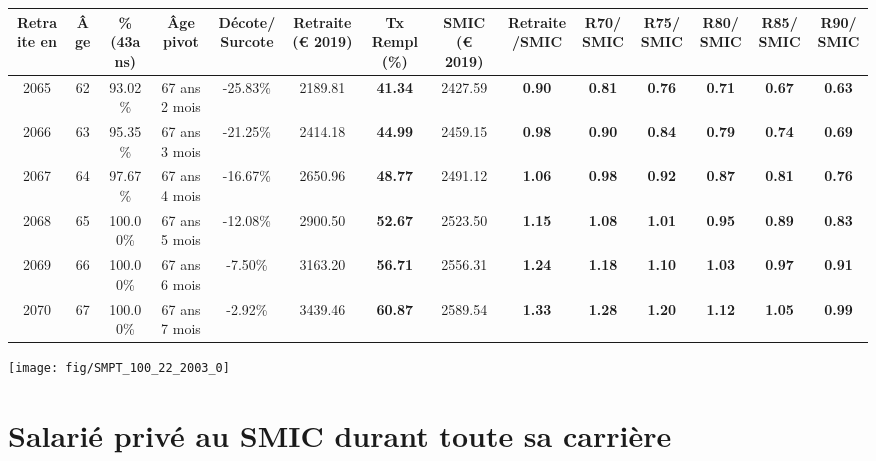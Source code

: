 \begin{adjustbox}{max width=\textwidth} 
\begin{tabular}[htb]{|c|c||c|c|c||c|c||c|c||c|c|c|c|c|} 
\hline 
 Retraite en &  Âge &  \%(43ans) &  Âge pivot &  Décote/Surcote &  Retraite (\euro{} 2019) &  Tx Rempl(\%) &  SMIC (\euro{} 2019) &  Retraite/SMIC &  R70/SMIC &  R75/SMIC &  R80/SMIC &  R85/SMIC &  R90/SMIC \\ 
\hline \hline 
 2065 &  62 &  93.02\% &  67 ans 2 mois &  -25.83\% &  2189.81 &  {\bf 41.34} &  2427.59 &  {\bf {\color{red} 0.90}} &  {\bf {\color{red} 0.81}} &  {\bf {\color{red} 0.76}} &  {\bf {\color{red} 0.71}} &  {\bf {\color{red} 0.67}} &  {\bf {\color{red} 0.63}} \\ 
\hline 
 2066 &  63 &  95.35\% &  67 ans 3 mois &  -21.25\% &  2414.18 &  {\bf 44.99} &  2459.15 &  {\bf {\color{red} 0.98}} &  {\bf {\color{red} 0.90}} &  {\bf {\color{red} 0.84}} &  {\bf {\color{red} 0.79}} &  {\bf {\color{red} 0.74}} &  {\bf {\color{red} 0.69}} \\ 
\hline 
 2067 &  64 &  97.67\% &  67 ans 4 mois &  -16.67\% &  2650.96 &  {\bf 48.77} &  2491.12 &  {\bf 1.06} &  {\bf {\color{red} 0.98}} &  {\bf {\color{red} 0.92}} &  {\bf {\color{red} 0.87}} &  {\bf {\color{red} 0.81}} &  {\bf {\color{red} 0.76}} \\ 
\hline 
 2068 &  65 &  100.00\% &  67 ans 5 mois &  -12.08\% &  2900.50 &  {\bf 52.67} &  2523.50 &  {\bf 1.15} &  {\bf 1.08} &  {\bf 1.01} &  {\bf {\color{red} 0.95}} &  {\bf {\color{red} 0.89}} &  {\bf {\color{red} 0.83}} \\ 
\hline 
 2069 &  66 &  100.00\% &  67 ans 6 mois &  -7.50\% &  3163.20 &  {\bf 56.71} &  2556.31 &  {\bf 1.24} &  {\bf 1.18} &  {\bf 1.10} &  {\bf 1.03} &  {\bf {\color{red} 0.97}} &  {\bf {\color{red} 0.91}} \\ 
\hline 
 2070 &  67 &  100.00\% &  67 ans 7 mois &  -2.92\% &  3439.46 &  {\bf 60.87} &  2589.54 &  {\bf 1.33} &  {\bf 1.28} &  {\bf 1.20} &  {\bf 1.12} &  {\bf 1.05} &  {\bf {\color{red} 0.99}} \\ 
\hline 
\hline 
\end{tabular} 
\end{adjustbox} 
 
 \vspace{0.1cm} 

 {\hspace{-2.2cm}\texttt{[image: fig/SMPT\_100\_22\_2003\_0]}} 

\newpage 
 
\chapter{Salarié privé au SMIC durant toute sa carrière} 


